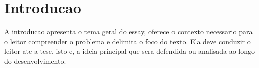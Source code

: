 \section{Introducao}

A introducao apresenta o tema geral do essay, oferece o contexto necessario
para o leitor compreender o problema e delimita o foco do texto. Ela deve
conduzir o leitor ate a tese, isto e, a ideia principal que sera defendida ou
analisada ao longo do desenvolvimento.

